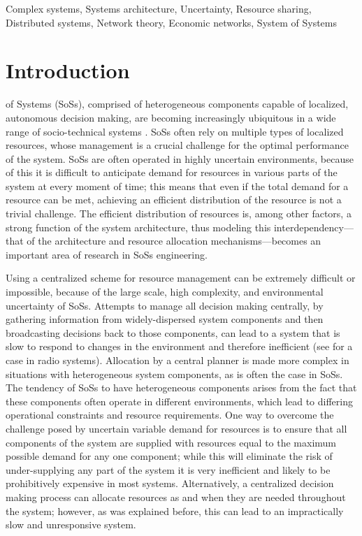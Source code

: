 \documentclass[journal,onecolumn]{IEEEtran}
\theoremstyle{plain}
\begin{document}
\begin{IEEEkeywords}
Complex systems, Systems architecture, Uncertainty, Resource sharing, Distributed systems, Network theory, Economic networks, System of Systems
\end{IEEEkeywords}




\IEEEpeerreviewmaketitle



\section{Introduction}
 of Systems (SoSs), comprised of heterogeneous components capable of localized, autonomous decision making, are becoming increasingly ubiquitous in a wide range of socio-technical systems \citep{sauser2010systomics,maier1996architecting,jamshidi2011system,mina2006complex}. SoSs often rely on multiple types of localized resources, whose management is a crucial challenge for the optimal performance of the system. SoSs are often operated in highly uncertain environments, because of this it is difficult to anticipate demand for resources in various parts of the system at every moment of time; this means that even if the total demand for a resource can be met, achieving an efficient distribution of the resource is not a trivial challenge. The efficient distribution of resources is, among other factors, a strong function of the system architecture, thus modeling this interdependency---that of the architecture and resource allocation mechanisms---becomes an important area of research in SoSs engineering.

Using a centralized scheme for resource management can be extremely difficult or impossible, because of the large scale, high complexity, and environmental uncertainty of SoSs. 
Attempts to manage all decision making centrally, by gathering information from widely-dispersed system components and then broadcasting decisions back to those components, can lead to a system that is slow to respond to changes in the environment and therefore inefficient (see \cite{koutsopoulos2010auction} for a case in radio systems). Allocation by a central planner is made more complex in situations with heterogeneous system components, as is often the case in SoSs. The tendency of SoSs to have heterogeneous components arises from the fact that these components often operate in different environments, which lead to differing operational constraints and resource requirements. One way to overcome the challenge posed by uncertain variable demand for resources is to ensure that all components of the system are supplied with resources equal to the maximum possible demand for any one component; while this will eliminate the risk of under-supplying any part of the system it is very inefficient and likely to be prohibitively expensive in most systems. Alternatively, a centralized decision making process can allocate resources as and when they are needed throughout the system; however, as was explained before, this can lead to an impractically slow and unresponsive system. 
\end{document}
